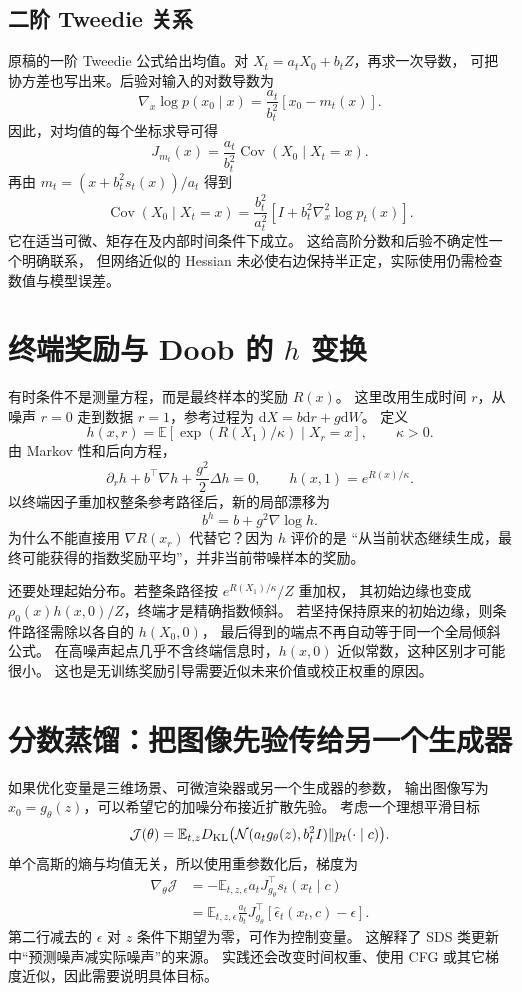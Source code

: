 \subsection{二阶 Tweedie 关系}
原稿的一阶 Tweedie 公式给出均值。对 $X_t=a_tX_0+b_tZ$，再求一次导数，
可把协方差也写出来。后验对输入的对数导数为
\[
\nabla_x\log p(x_0\mid x)
=\frac{a_t}{b_t^2}[x_0-m_t(x)].
\]
因此，对均值的每个坐标求导可得
\[
J_{m_t}(x)=\frac{a_t}{b_t^2}\operatorname{Cov}(X_0\mid X_t=x).
\]
再由 $m_t=(x+b_t^2s_t(x))/a_t$ 得到
\[
\operatorname{Cov}(X_0\mid X_t=x)
=\frac{b_t^2}{a_t^2}\left[I+b_t^2\nabla_x^2\log p_t(x)\right].
\label{supp:second-tweedie}
\]
它在适当可微、矩存在及内部时间条件下成立。
这给高阶分数和后验不确定性一个明确联系，
但网络近似的 Hessian 未必使右边保持半正定，实际使用仍需检查数值与模型误差。

\section{终端奖励与 Doob 的 $h$ 变换}
有时条件不是测量方程，而是最终样本的奖励 $R(x)$。
这里改用生成时间 $r$，从噪声 $r=0$ 走到数据 $r=1$，参考过程为
$\mathrm dX=b\mathrm dr+g\mathrm dW$。
定义
\[
h(x,r)=\mathbb E\left[\exp(R(X_1)/\kappa)\mid X_r=x\right],\qquad\kappa>0.
\]
由 Markov 性和后向方程，
\[
\partial_rh+b^\top\nabla h+\frac{g^2}{2}\Delta h=0,
\qquad h(x,1)=e^{R(x)/\kappa}.
\]
以终端因子重加权整条参考路径后，新的局部漂移为
\[
b^h=b+g^2\nabla\log h.
\]
为什么不能直接用 $\nabla R(x_r)$ 代替它？因为 $h$ 评价的是
“从当前状态继续生成，最终可能获得的指数奖励平均”，并非当前带噪样本的奖励。

还要处理起始分布。若整条路径按 $e^{R(X_1)/\kappa}/Z$ 重加权，
其初始边缘也变成 $\rho_0(x)h(x,0)/Z$，终端才是精确指数倾斜。
若坚持保持原来的初始边缘，则条件路径需除以各自的 $h(X_0,0)$，
最后得到的端点不再自动等于同一个全局倾斜公式。
在高噪声起点几乎不含终端信息时，$h(x,0)$ 近似常数，这种区别才可能很小。
这也是无训练奖励引导需要近似未来价值或校正权重的原因。

\section{分数蒸馏：把图像先验传给另一个生成器}
如果优化变量是三维场景、可微渲染器或另一个生成器的参数，
输出图像写为 $x_0=g_\theta(z)$，可以希望它的加噪分布接近扩散先验。
考虑一个理想平滑目标
\[
\mathcal J(\theta)=\mathbb E_{t,z}
 D_{\rm KL}\bigl(\mathcal N(a_tg_\theta(z),b_t^2I)\|p_t(\cdot\mid c)\bigr).
\]
单个高斯的熵与均值无关，所以使用重参数化后，梯度为
\begin{align}
\nabla_\theta\mathcal J
 &=-\mathbb E_{t,z,\epsilon}
 a_tJ_{g_\theta}^\top s_t(x_t\mid c)\\
 &=\mathbb E_{t,z,\epsilon}\frac{a_t}{b_t}
 J_{g_\theta}^\top[\hat\epsilon_t(x_t,c)-\epsilon].
\end{align}
第二行减去的 $\epsilon$ 对 $z$ 条件下期望为零，可作为控制变量。
这解释了 SDS 类更新中“预测噪声减实际噪声”的来源。
实践还会改变时间权重、使用 CFG 或其它梯度近似，因此需要说明具体目标。

